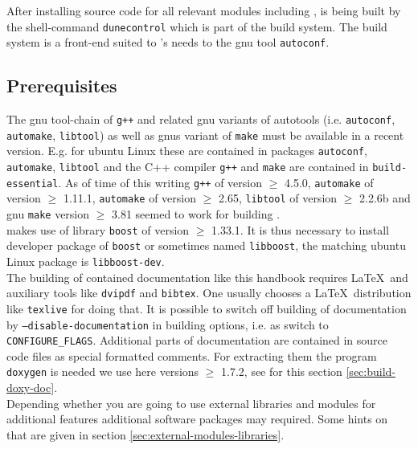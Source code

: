 After installing source code for all relevant \Dune modules including \Dumux, \Dune is being built by the shell-command \texttt{dunecontrol} which is part of the {\Dune} build system. The {\Dune} build system is a front-end suited to \Dune's needs to the gnu tool \texttt{autoconf}.

\subsection{Prerequisites} \label{sec:prerequisites}
The gnu tool-chain of \texttt{g++}  and related gnu variants of autotools
(i.e. \texttt{autoconf}, \texttt{automake}, \texttt{libtool}) as well as gnus variant of \texttt{make}
must be available in a recent version. E.g. for ubuntu Linux these are contained in
packages \texttt{autoconf}, \texttt{automake}, \texttt{libtool}
and the C++ compiler \texttt{g++} and \texttt{make} are contained in \texttt{build-essential}.
As of time of this writing \texttt{g++} of version $\geqslant$ 4.5.0, \texttt{automake} of version $\geqslant$ 1.11.1,
\texttt{automake} of version $\geqslant$ 2.65,  \texttt{libtool} of version $\geqslant$ 2.2.6b
and gnu \texttt{make} version $\geqslant$ 3.81 seemed to work for building \Dumux.\\

\Dumux makes use of library \texttt{boost} of version $\geqslant$ 1.33.1.
It is thus necessary to install developer package of \texttt{boost}
or sometimes named \texttt{libboost}, the matching ubuntu Linux package is \texttt{libboost-dev}. \\

The building of contained documentation like this handbook requires \LaTeX\  and auxiliary tools
like \texttt{dvipdf} and \texttt{bibtex}. One usually chooses a \LaTeX\  distribution like \texttt{texlive} for doing that.
It is possible to switch off building of documentation by \texttt{--disable-documentation} in building options, i.e. as switch to \texttt{CONFIGURE\_FLAGS}.
Additional parts of documentation are contained in source code files as special formatted comments.
For extracting them the program \texttt{doxygen} is needed we use here versions $\geqslant$ 1.7.2, see for this section \ref{sec:build-doxy-doc}.\\

Depending whether you are going to use external libraries and modules for additional \Dune features 
additional software packages  may required. Some hints on that are given in section \ref{sec:external-modules-libraries}.\\

